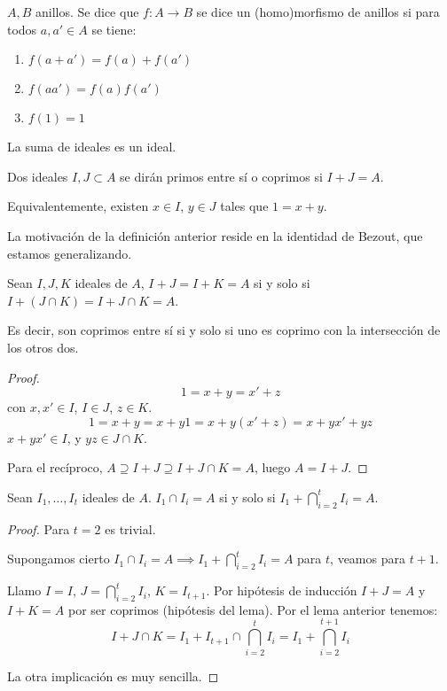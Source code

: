 \begin{df}
  \(A,B\) anillos. Se dice que \(f:A\longrightarrow B\) se dice un
  (homo)morfismo de anillos si para todos \(a,a'\in A\) se tiene:
  \begin{enumerate}
    \item \(f(a+a')=f(a)+f(a')\)
    \item \(f(aa')=f(a)f(a')\)
    \item \(f(1)=1\)
  \end{enumerate}
\end{df}

La suma de ideales es un ideal.

\begin{df}
  Dos ideales \(I, J\subset A\) se dirán primos entre sí
  o coprimos si \(I+J=A\).

  Equivalentemente, existen \(x\in I\), \(y\in J\) tales que
  \(1=x+y\).
\end{df}

La motivación de la definición anterior reside en la identidad
de Bezout, que estamos generalizando.

\begin{lema}
  Sean \(I, J, K\) ideales de \(A\),
  \(I+J=I+K=A\) si y solo si \(I+(J\cap K)=I+J\cap K=A\).

  Es decir, son coprimos entre sí si y solo si uno es coprimo
  con la intersección de los otros dos.
\end{lema}
\begin{proof}
  \[1=x+y=x'+z\]
  con \(x,x'\in I\), \(I\in J\), \(z\in K\).
  \[1=x+y=x+y1=x+y(x'+z)=x+yx'+yz\]
  \(x+yx'\in I\), y \(yz\in J\cap K\).

  Para el recíproco, \(A\supseteq I+J\supseteq I+J\cap K=A\),
  luego \(A=I+J\).
\end{proof}

\begin{lema}
  Sean \(I_1,\ldots, I_t\) ideales de \(A\).
  \(I_1\cap I_i=A\) si y solo si
  \(I_1+\bigcap_{i=2}^t I_i=A\).
\end{lema}
\begin{proof}
  Para \(t=2\) es trivial.

  Supongamos cierto \(I_1\cap I_i=A\implies
  I_1+\bigcap_{i=2}^t I_i=A\) para \(t\), veamos para \(t+1\).

  Llamo \(I=I\), \(J=\bigcap_{i=2}^t I_i\), \(K=I_{t+1}\).
  Por hipótesis de inducción \(I+J=A\) y \(I+K=A\) por ser coprimos
  (hipótesis del lema). Por el lema anterior tenemos:
  \[
    I+J\cap K=I_1+I_{t+1}\cap \bigcap_{i=2}^{t}
    I_i =I_1 + \bigcap_{i=2}^{t+1} I_i
  \]

  La otra implicación es muy sencilla.
\end{proof}


